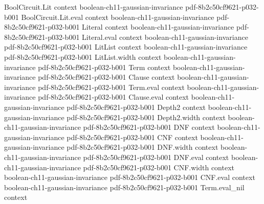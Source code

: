 \begin{theorem}
\leanok
{}
\proofstep
  {BoolCircuit.Lit}
  {context}
  {boolean-ch11-gaussian-invariance}
  {pdf-8b2c50cf9621-p032-b001}
\proofstep
  {BoolCircuit.Lit.eval}
  {context}
  {boolean-ch11-gaussian-invariance}
  {pdf-8b2c50cf9621-p032-b001}
\proofstep
  {Literal}
  {context}
  {boolean-ch11-gaussian-invariance}
  {pdf-8b2c50cf9621-p032-b001}
\proofstep
  {Literal.eval}
  {context}
  {boolean-ch11-gaussian-invariance}
  {pdf-8b2c50cf9621-p032-b001}
\proofstep
  {LitList}
  {context}
  {boolean-ch11-gaussian-invariance}
  {pdf-8b2c50cf9621-p032-b001}
\proofstep
  {LitList.width}
  {context}
  {boolean-ch11-gaussian-invariance}
  {pdf-8b2c50cf9621-p032-b001}
\proofstep
  {Term}
  {context}
  {boolean-ch11-gaussian-invariance}
  {pdf-8b2c50cf9621-p032-b001}
\proofstep
  {Clause}
  {context}
  {boolean-ch11-gaussian-invariance}
  {pdf-8b2c50cf9621-p032-b001}
\proofstep
  {Term.eval}
  {context}
  {boolean-ch11-gaussian-invariance}
  {pdf-8b2c50cf9621-p032-b001}
\proofstep
  {Clause.eval}
  {context}
  {boolean-ch11-gaussian-invariance}
  {pdf-8b2c50cf9621-p032-b001}
\proofstep
  {Depth2}
  {context}
  {boolean-ch11-gaussian-invariance}
  {pdf-8b2c50cf9621-p032-b001}
\proofstep
  {Depth2.width}
  {context}
  {boolean-ch11-gaussian-invariance}
  {pdf-8b2c50cf9621-p032-b001}
\proofstep
  {DNF}
  {context}
  {boolean-ch11-gaussian-invariance}
  {pdf-8b2c50cf9621-p032-b001}
\proofstep
  {CNF}
  {context}
  {boolean-ch11-gaussian-invariance}
  {pdf-8b2c50cf9621-p032-b001}
\proofstep
  {DNF.width}
  {context}
  {boolean-ch11-gaussian-invariance}
  {pdf-8b2c50cf9621-p032-b001}
\proofstep
  {DNF.eval}
  {context}
  {boolean-ch11-gaussian-invariance}
  {pdf-8b2c50cf9621-p032-b001}
\proofstep
  {CNF.width}
  {context}
  {boolean-ch11-gaussian-invariance}
  {pdf-8b2c50cf9621-p032-b001}
\proofstep
  {CNF.eval}
  {context}
  {boolean-ch11-gaussian-invariance}
  {pdf-8b2c50cf9621-p032-b001}
\proofstep
  {Term.eval_nil}
  {context}

\end{theorem}
